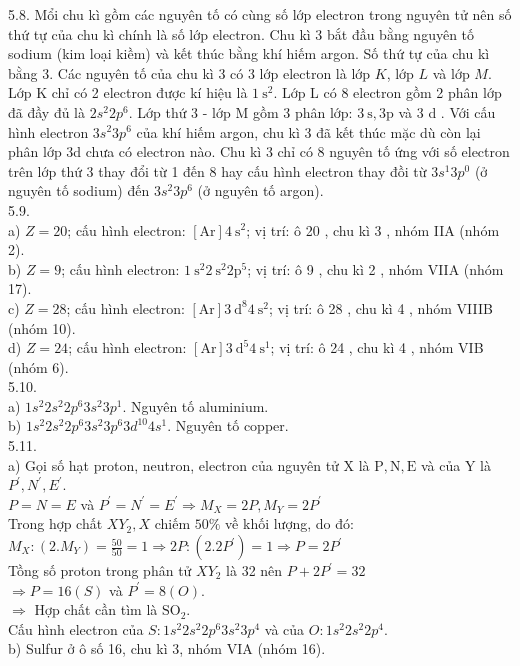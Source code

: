 \documentclass[10pt]{article}
\begin{document}
5.8. Mổi chu kì gồm các nguyên tố có cùng số lớp electron trong nguyên tử nên số thứ tự của chu kì chính là số lớp electron. Chu kì 3 bắt đầu bằng nguyên tố sodium (kim loại kiềm) và kết thúc bằng khí hiếm argon. Số thứ tự của chu kì bằng 3. Các nguyên tố của chu kì 3 có 3 lớp electron là lớp $K$, lớp $L$ và lớp $M$. Lớp K chỉ có 2 electron được kí hiệu là $1 \mathrm{~s}^{2}$. Lớp L có 8 electron gồm 2 phân lớp đã đầy đủ là $2 s^{2} 2 p^{6}$. Lớp thứ 3 - lớp M gồm 3 phân lớp: $3 \mathrm{~s}, 3 \mathrm{p}$ và 3 d . Với cấu hình electron $3 s^{2} 3 p^{6}$ của khí hiếm argon, chu kì 3 đã kết thúc mặc dù còn lại phân lớp 3d chưa có electron nào. Chu kì 3 chỉ có 8 nguyên tố ứng với số electron trên lớp thứ 3 thay đổi từ 1 đến 8 hay cấu hình electron thay đồi từ $3 s^{1} 3 p^{0}$ (ở nguyên tố sodium) đến $3 s^{2} 3 p^{6}$ (ở nguyên tố argon).\\
5.9.\\
a) $Z=20$; cấu hình electron: $[\mathrm{Ar}] 4 \mathrm{~s}^{2}$; vị trí: ô 20 , chu kì 3 , nhóm IIA (nhóm 2).\\
b) $Z=9$; cấu hình electron: $1 \mathrm{~s}^{2} 2 \mathrm{~s}^{2} 2 \mathrm{p}^{5}$; vị trí: ô 9 , chu kì 2 , nhóm VIIA (nhóm 17).\\
c) $Z=28$; cấu hình electron: $[\mathrm{Ar}] 3 \mathrm{~d}^{8} 4 \mathrm{~s}^{2}$; vị trí: ô 28 , chu kì 4 , nhóm VIIIB (nhóm 10).\\
d) $Z=24$; cấu hình electron: $[\mathrm{Ar}] 3 \mathrm{~d}^{5} 4 \mathrm{~s}^{1}$; vị trí: ô 24 , chu kì 4 , nhóm VIB (nhóm 6).\\
5.10.\\
a) $1 s^{2} 2 s^{2} 2 p^{6} 3 s^{2} 3 p^{1}$. Nguyên tố aluminium.\\
b) $1 s^{2} 2 s^{2} 2 p^{6} 3 s^{2} 3 p^{6} 3 d^{10} 4 s^{1}$. Nguyên tố copper.\\
5.11.\\
a) Gọi số hạt proton, neutron, electron của nguyên tử X là $\mathrm{P}, \mathrm{N}, \mathrm{E}$ và của Y là $P^{\prime}, N^{\prime}, E^{\prime}$.\\
$P=N=E$ và $P^{\prime}=N^{\prime}=E^{\prime} \Rightarrow M_{X}=2 P, M_{Y}=2 P^{\prime}$\\
Trong hợp chất $X Y_{2}, X$ chiếm $50 \%$ về khối lượng, do đó:\\
$M_{X}:\left(2 . M_{Y}\right)=\frac{50}{50}=1 \Rightarrow 2 P:\left(2.2 P^{\prime}\right)=1 \Rightarrow P=2 P^{\prime}$\\
Tồng số proton trong phân tử $X Y_{2}$ là 32 nên $P+2 P^{\prime}=32$\\
$\Rightarrow P=16(S)$ và $P^{\prime}=8(O)$.\\
$\Rightarrow$ Hợp chất cần tìm là $\mathrm{SO}_{2}$.\\
Cấu hình electron của $S: 1 s^{2} 2 s^{2} 2 p^{6} 3 s^{2} 3 p^{4}$ và của $O: 1 s^{2} 2 s^{2} 2 p^{4}$.\\
b) Sulfur ở ô số 16, chu kì 3, nhóm VIA (nhóm 16).
\end{document}
